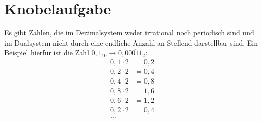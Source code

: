 \documentclass[a4paper]{article}
\begin{document}
\section{Knobelaufgabe}
Es gibt Zahlen, die im Dezimalsystem weder irrational noch periodisch sind und im Dualsystem nicht durch eine endliche Anzahl an Stellend darstellbar sind. Ein Beispiel hierfür ist die Zahl $0,1_{10} \rightarrow 0,0\overline{0011}_{2}$:
\begin{align*}
0,1 \cdot 2 &= 0,2 \\
0,2 \cdot 2 &= 0,4 \\
0,4 \cdot 2 &= 0,8 \\
0,8 \cdot 2 &= 1,6 \\
0,6 \cdot 2 &= 1,2 \\
0,2 \cdot 2 &= 0,4 \\
\text{\ldots}
\end{align*}
\end{document}
